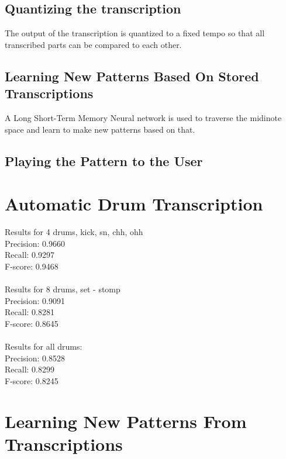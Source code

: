 \documentclass[10pt]{article}
\begin{document}
\subsection{Quantizing the transcription}
The output of the transcription is quantized to a fixed tempo so that all transcribed parts can be compared to each other. 
\subsection{Learning New Patterns Based On Stored Transcriptions}
A Long Short-Term Memory Neural network is used to traverse the midinote space and learn to make new patterns based on that.
\subsection{Playing the Pattern to the User}
\section{Automatic Drum Transcription}
Results for 4 drums, kick, sn, chh, ohh
\\
Precision: 0.9660\\
Recall: 0.9297\\
F-score: 0.9468\\
\\
Results for 8 drums, set - stomp\\
Precision: 0.9091\\
Recall: 0.8281\\
F-score: 0.8645\\
\\
Results for all drums:\\
Precision: 0.8528\\
Recall: 0.8299\\
F-score: 0.8245\\
\section{Learning New Patterns From Transcriptions}
\end{document}
